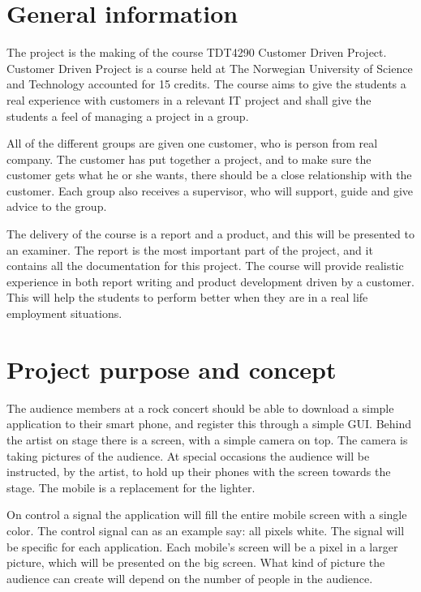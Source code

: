 \section{General information}
The project is the making of the course TDT4290 Customer Driven Project. 
Customer Driven Project is a course held at The Norwegian University of Science and Technology accounted for 15 credits. 
The course aims to give the students a real experience with customers in a relevant IT project and shall give the students a feel of managing a project in a group.

All of the different groups are given one customer, who is person from real company. 
The customer has put together a project, and to make sure the customer gets what he or she wants, there should be a close relationship with the customer.
Each group also receives a supervisor, who will support, guide and give advice to the group. 

The delivery of the course is a report and a product, and this will be presented to an examiner. 
The report is the most important part of the project, and it contains all the documentation for this project. The course will provide realistic experience in both report writing and product development driven by a customer. 
This will help the students to perform better when they are in a real life employment situations.


\section{Project purpose and concept}
The audience members at a rock concert should be able to download a simple application to their smart phone, and register this through a simple GUI.
Behind the artist on stage there is a screen, with a simple camera on top. 
The camera is taking pictures of the audience. 
At special occasions the audience will be instructed, by the artist, to hold up their phones with the screen towards the stage. 
The mobile is a replacement for the lighter.  

On control a signal the application will fill the entire mobile screen with a single color.
The control signal can as an example say: all pixels white.
The signal will be specific for each application.
Each mobile's screen will be a pixel in a larger picture, which will be presented on the big screen. 
What kind of picture the audience can create will depend on the number of people in the audience. 

